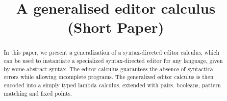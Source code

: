 \documentclass[sigplan,screen]{acmart}
\begin{document}
\title{A generalised editor calculus (Short Paper)}
























\renewcommand{\shortauthors}{AAU Bachelor}

\begin{abstract}
In this paper, we present a generalization of a syntax-directed editor calculus, which can be used to instantiate a specialized syntax-directed editor for any language, given by some abstract syntax. The editor calculus guarantees the absence of syntactical errors while allowing incomplete programs. The generalized editor calculus is then encoded into a simply typed lambda calculus, extended with pairs, booleans, pattern matching and fixed points.
\end{abstract}
\end{document}
